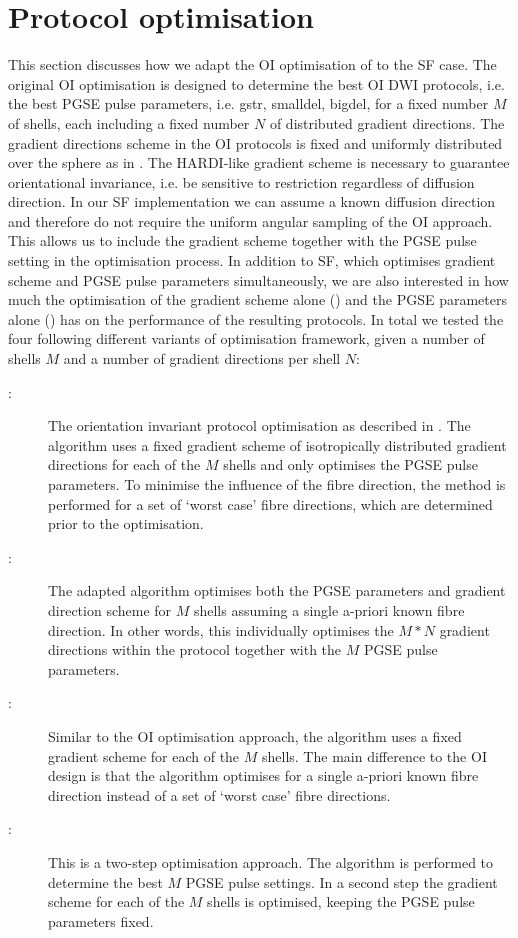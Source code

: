\section{Protocol optimisation}
\label{sec:chapter 7 four SF optimisations}
This section discusses how we adapt the \gls{OI} optimisation of \citet{Alexander:2008} to the \gls{SF} case. The original \gls{OI} optimisation is designed to determine the best \gls{OI}{} DWI protocols, i.e. the best PGSE pulse parameters, i.e. \gls{gstr}, \gls{smalldel}, \gls{bigdel}, for a fixed number $M$ of shells, each including a fixed number $N$ of distributed gradient directions. The gradient directions scheme in the \gls{OI}{} protocols is fixed and uniformly distributed over the sphere as in \citep{Cook:2007}. The HARDI-like gradient scheme is necessary to guarantee orientational invariance, i.e. be sensitive to restriction regardless of diffusion direction. In our \gls{SF} implementation we can assume a known diffusion direction and therefore do not require the uniform angular sampling of the \gls{OI} approach. This allows us to include the gradient scheme together with the PGSE pulse setting in the optimisation process. In addition to \gls{SF}, which optimises gradient scheme and PGSE pulse parameters simultaneously, we are also interested in how much the optimisation of the gradient scheme alone ({\DO}) and the PGSE parameters alone ({\SD}) has on the performance of the resulting protocols. In total we tested the four following different variants of  optimisation framework, given a number of shells $M$ and a number of gradient directions per shell $N$:

\begin{description}
	\item[\OI:] The orientation invariant protocol optimisation as described in \citep{Alexander:2008}. The algorithm uses a fixed gradient scheme of  isotropically distributed gradient directions for each of the $M$ shells and only optimises the PGSE pulse parameters. To minimise the influence of the fibre direction, the method is performed for a set of \lq worst case\rq{} fibre directions, which are determined prior to the optimisation.
	\item[\FD:] The adapted algorithm optimises both the PGSE parameters and gradient direction scheme for $M$ shells assuming a single a-priori known fibre direction. In other words, this individually optimises the $M*N$ gradient directions within the protocol together with the $M$ PGSE pulse parameters.
\item[\SD:] Similar to the {\gls{OI}} optimisation approach, the algorithm uses a fixed gradient scheme for each of the $M$ shells. The main difference to the \gls{OI}{} design is that the algorithm optimises for a single a-priori known fibre direction instead of a set of \lq worst case\rq{} fibre directions.
	\item[\DO:] This is a two-step optimisation approach. The {\SD} algorithm is performed to determine the best $M$ PGSE pulse settings. In a second step the gradient scheme for each of the $M$ shells is optimised, keeping the PGSE pulse parameters fixed.
\end{description}

